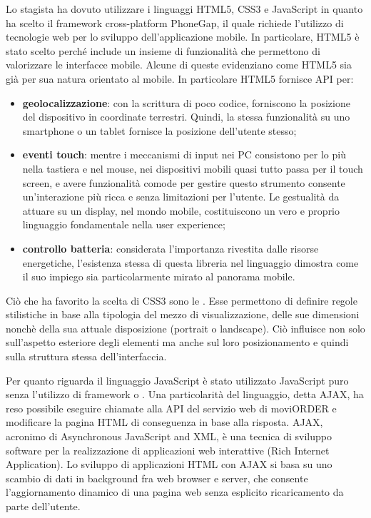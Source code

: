Lo stagista ha dovuto utilizzare i linguaggi HTML5, CSS3 e JavaScript in quanto ha scelto il framework cross-platform PhoneGap, il quale richiede l'utilizzo di tecnologie web per lo sviluppo dell'applicazione mobile. In particolare, HTML5 è stato scelto perché include un insieme di funzionalità che permettono di valorizzare le interfacce mobile. Alcune di queste evidenziano come HTML5 sia già per sua natura orientato al mobile. In particolare HTML5 fornisce API per:
\begin{itemize}
	\item \textbf{geolocalizzazione}: con la scrittura di poco codice, forniscono la posizione del dispositivo in coordinate terrestri. Quindi, la stessa funzionalità su uno smartphone o un tablet fornisce la posizione dell'utente stesso;
	\item \textbf{eventi touch}: mentre i meccanismi di input nei PC consistono per lo più nella tastiera e nel mouse, nei dispositivi mobili quasi tutto passa per il touch screen, e avere funzionalità comode per gestire questo strumento consente un’interazione più ricca e senza limitazioni per l’utente. Le gestualità da attuare su un display, nel mondo mobile, costituiscono un vero e proprio linguaggio fondamentale nella user experience;
	\item \textbf{controllo batteria}: considerata l’importanza rivestita dalle risorse energetiche, l’esistenza stessa di questa libreria nel linguaggio dimostra come il suo impiego sia particolarmente mirato al panorama mobile.
\end{itemize}

Ciò che ha favorito la scelta di CSS3 sono le . Esse permettono di definire regole stilistiche in base alla tipologia del mezzo di visualizzazione, delle sue dimensioni nonchè della sua attuale disposizione (portrait o landscape). Ciò influisce non solo sull’aspetto esteriore degli elementi ma anche sul loro posizionamento e quindi sulla struttura stessa dell’interfaccia.

Per quanto riguarda il linguaggio JavaScript è stato utilizzato JavaScript puro senza l'utilizzo di framework o . Una particolarità del linguaggio, detta AJAX, ha reso possibile eseguire chiamate alla API del servizio web di moviORDER e modificare la pagina HTML di conseguenza in base alla risposta. AJAX, acronimo di Asynchronous JavaScript and XML, è una tecnica di sviluppo software per la realizzazione di applicazioni web interattive (Rich Internet Application). Lo sviluppo di applicazioni HTML con AJAX si basa su uno scambio di dati in background fra web browser e server, che consente l'aggiornamento dinamico di una pagina web senza esplicito ricaricamento da parte dell'utente.

